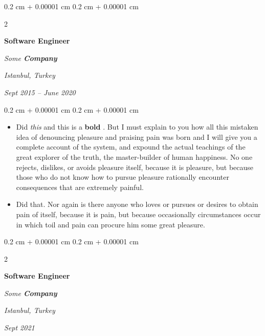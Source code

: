 \documentclass[10pt, letterpaper]{article}
\newenvironment{highlights}{
    \begin{itemize}[
        topsep=0.10 cm,
        parsep=0.10 cm,
        partopsep=0pt,
        itemsep=0pt,
        leftmargin=0.4 cm + 10pt
    ]
}{
    \end{itemize}
} %
\newenvironment{onecolentry}{
    \begin{adjustwidth}{
        0.2 cm + 0.00001 cm
    }{
        0.2 cm + 0.00001 cm
    }
}{
    \end{adjustwidth}
} %
\newenvironment{twocolentry}[2][]{
    \onecolentry
    \def\secondColumn{#2}
    \setcolumnwidth{\fill, 4.5 cm}
    \begin{paracol}{2}
}{
    \switchcolumn \raggedleft \secondColumn
    \end{paracol}
    \endonecolentry
} %
\let\hrefWithoutArrow\href
\renewcommand{\href}[2]{\hrefWithoutArrow{#1}{\ifthenelse{\equal{#2}{}}{ }{#2 }\raisebox{.15ex}{\footnotesize \faExternalLink*}}}
\begin{document}
        \vspace{0.2 cm}

        \begin{twocolentry}{
        \textit{Istanbul, Turkey}    
            
        \textit{Sept 2015 – June 2020}}
            \textbf{Software Engineer}
            
            \textit{Some \textbf{Company}}
        \end{twocolentry}

        \vspace{0.10 cm}
        \begin{onecolentry}
            \begin{highlights}
                \item Did \textit{this} and this is a \textbf{bold} \href{https://example.com}{link}. But I must explain to you how all this mistaken idea of denouncing pleasure and praising pain was born and I will give you a complete account of the system, and expound the actual teachings of the great explorer of the truth, the master-builder of human happiness. No one rejects, dislikes, or avoids pleasure itself, because it is pleasure, but because those who do not know how to pursue pleasure rationally encounter consequences that are extremely painful.
                \item Did that. Nor again is there anyone who loves or pursues or desires to obtain pain of itself, because it is pain, but because occasionally circumstances occur in which toil and pain can procure him some great pleasure.
            \end{highlights}
        \end{onecolentry}


        \vspace{0.2 cm}

        \begin{twocolentry}{
        \textit{Istanbul, Turkey}    
            
        \textit{Sept 2021}}
            \textbf{Software Engineer}
            
            \textit{Some \textbf{Company}}
        \end{twocolentry}
\end{document}
